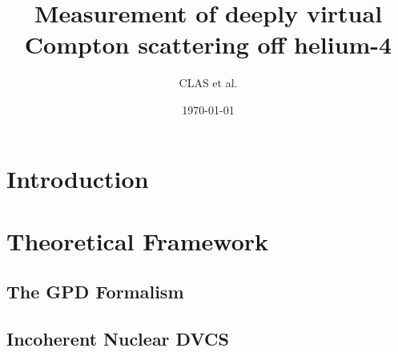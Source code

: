 \documentclass[aps,prc,preprint,superscriptaddress]{revtex4-1}
\begin{document}
\title{Measurement of deeply virtual Compton scattering off helium-4}


\author{CLAS et al.}

\noaffiliation

\date{\today}

\begin{abstract}
\end{abstract}

\pacs{}

\maketitle

\section{Introduction}

\section{Theoretical Framework}

  \subsection{The GPD Formalism}

  \subsection{Incoherent Nuclear DVCS}
\end{document}
